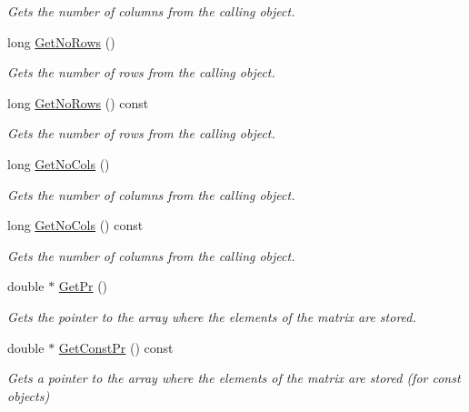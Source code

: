 \begin{DoxyCompactItemize}
\begin{DoxyCompactList}\small\item\em Gets the number of columns from the calling object. \item\end{DoxyCompactList}\item 
long \hyperlink{classDMatrix_ac5729ab1d4162789c067ed4928ea86e5}{GetNoRows} ()
\begin{DoxyCompactList}\small\item\em Gets the number of rows from the calling object. \item\end{DoxyCompactList}\item 
long \hyperlink{classDMatrix_a45ab6509deee2a3e1a13d27e2b3e929e}{GetNoRows} () const 
\begin{DoxyCompactList}\small\item\em Gets the number of rows from the calling object. \item\end{DoxyCompactList}\item 
long \hyperlink{classDMatrix_a16ac005120f99416a8e914aa1119eff1}{GetNoCols} ()
\begin{DoxyCompactList}\small\item\em Gets the number of columns from the calling object. \item\end{DoxyCompactList}\item 
long \hyperlink{classDMatrix_a8b234f10a804f49ccf711051ac022156}{GetNoCols} () const 
\begin{DoxyCompactList}\small\item\em Gets the number of columns from the calling object. \item\end{DoxyCompactList}\item 
double $\ast$ \hyperlink{classDMatrix_aeda5a29d08ef2a98344d65ba37fe53b1}{GetPr} ()
\begin{DoxyCompactList}\small\item\em Gets the pointer to the array where the elements of the matrix are stored. \item\end{DoxyCompactList}\item 
double $\ast$ \hyperlink{classDMatrix_a2b8280816c4f3508d522462fd09732cf}{GetConstPr} () const 
\begin{DoxyCompactList}\small\item\em Gets a pointer to the array where the elements of the matrix are stored (for const objects) \item\end{DoxyCompactList}\item 

\end{DoxyCompactItemize}
